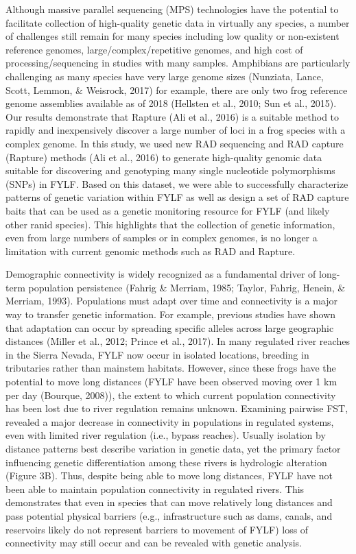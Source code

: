 \documentclass[twoside,12pt,final]{ucthesis-CA2012} %
\begin{document}
\begin{ucmainmatter}
Although massive parallel sequencing (MPS) technologies have the
potential to facilitate collection of high-quality genetic data in
virtually any species, a number of challenges still remain for many
species including low quality or non-existent reference genomes,
large/complex/repetitive genomes, and high cost of processing/sequencing
in studies with many samples. Amphibians are particularly challenging as
many species have very large genome sizes (Nunziata, Lance, Scott,
Lemmon, \& Weisrock, 2017) for example, there are only two frog
reference genome assemblies available as of 2018 (Hellsten et al., 2010;
Sun et al., 2015). Our results demonstrate that Rapture (Ali et al.,
2016) is a suitable method to rapidly and inexpensively discover a large
number of loci in a frog species with a complex genome. In this study,
we used new RAD sequencing and RAD capture (Rapture) methods (Ali et
al., 2016) to generate high-quality genomic data suitable for
discovering and genotyping many single nucleotide polymorphisms (SNPs)
in FYLF. Based on this dataset, we were able to successfully
characterize patterns of genetic variation within FYLF as well as design
a set of RAD capture baits that can be used as a genetic monitoring
resource for FYLF (and likely other ranid species). This highlights that
the collection of genetic information, even from large numbers of
samples or in complex genomes, is no longer a limitation with current
genomic methods such as RAD and Rapture.

Demographic connectivity is widely recognized as a fundamental driver of
long-term population persistence (Fahrig \& Merriam, 1985; Taylor,
Fahrig, Henein, \& Merriam, 1993). Populations must adapt over time and
connectivity is a major way to transfer genetic information. For
example, previous studies have shown that adaptation can occur by
spreading specific alleles across large geographic distances (Miller et
al., 2012; Prince et al., 2017). In many regulated river reaches in the
Sierra Nevada, FYLF now occur in isolated locations, breeding in
tributaries rather than mainstem habitats. However, since these frogs
have the potential to move long distances (FYLF have been observed
moving over 1 km per day (Bourque, 2008)), the extent to which current
population connectivity has been lost due to river regulation remains
unknown. Examining pairwise FST, revealed a major decrease in
connectivity in populations in regulated systems, even with limited
river regulation (i.e., bypass reaches). Usually isolation by distance
patterns best describe variation in genetic data, yet the primary factor
influencing genetic differentiation among these rivers is hydrologic
alteration (Figure 3B). Thus, despite being able to move long distances,
FYLF have not been able to maintain population connectivity in regulated
rivers. This demonstrates that even in species that can move relatively
long distances and pass potential physical barriers (e.g.,
infrastructure such as dams, canals, and reservoirs likely do not
represent barriers to movement of FYLF) loss of connectivity may still
occur and can be revealed with genetic analysis.


\end{ucmainmatter}
\end{document}
